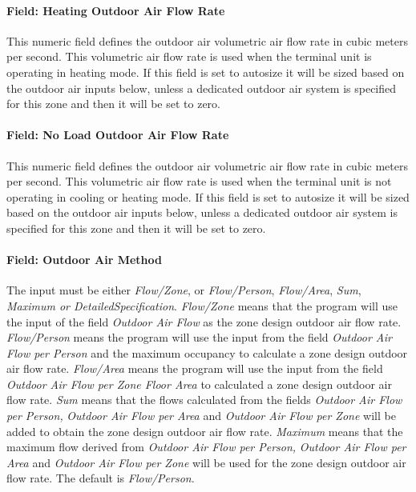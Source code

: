 \paragraph{Field: Heating Outdoor Air Flow Rate}\label{field-heating-outdoor-air-flow-rate}

This numeric field defines the outdoor air volumetric air flow rate in cubic meters per second. This volumetric air flow rate is used when the terminal unit is operating in heating mode. If this field is set to autosize it will be sized based on the outdoor air inputs below, unless a dedicated outdoor air system is specified for this zone and then it will be set to zero.

\paragraph{Field: No Load Outdoor Air Flow Rate}\label{field-no-load-outdoor-air-flow-rate}

This numeric field defines the outdoor air volumetric air flow rate in cubic meters per second. This volumetric air flow rate is used when the terminal unit is not operating in cooling or heating mode. If this field is set to autosize it will be sized based on the outdoor air inputs below, unless a dedicated outdoor air system is specified for this zone and then it will be set to zero.

\paragraph{Field: Outdoor Air Method}\label{field-outdoor-air-method-6}

The input must be either \emph{Flow/Zone}, or \emph{Flow/Person}, \emph{Flow/Area}, \emph{Sum}, \emph{Maximum or DetailedSpecification}. \emph{Flow/Zone} means that the program will use the input of the field \emph{Outdoor Air Flow} as the zone design outdoor air flow rate. \emph{Flow/Person} means the program will use the input from the field \emph{Outdoor Air Flow per Person} and the maximum occupancy to calculate a zone design outdoor air flow rate. \emph{Flow/Area} means the program will use the input from the field \emph{Outdoor Air Flow per Zone Floor Area} to calculated a zone design outdoor air flow rate. \emph{Sum} means that the flows calculated from the fields \emph{Outdoor Air Flow per Person,} \emph{Outdoor Air Flow per Area} and \emph{Outdoor Air Flow per Zone} will be added to obtain the zone design outdoor air flow rate. \emph{Maximum} means that the maximum flow derived from \emph{Outdoor Air Flow per Person,} \emph{Outdoor Air Flow per Area} and \emph{Outdoor Air Flow per Zone} will be used for the zone design outdoor air flow rate. The default is \emph{Flow/Person}.


